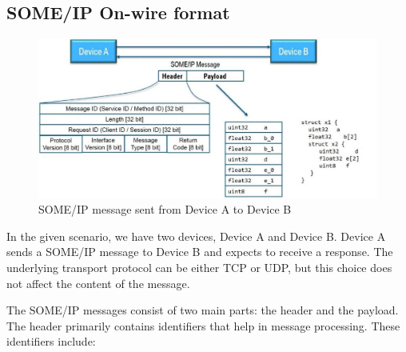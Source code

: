 \documentclass[
12pt,
oneside, 
onehalfspacing, 
nolistspacing, 
parskip, 
chapterinoneline, 
]{AASTCOMPUTER}
\begin{document}
\subsection{SOME/IP On-wire format}
\begin{figure}[!ht]
\centering
\includegraphics[scale=0.3]{Figures/18.png}
\caption[SOMEIP message sent from Device A to Device B]{SOME/IP message sent from Device A to Device B}
\label{fig:SOME/IP On-wire format}
\end{figure}


In the given scenario, we have two devices, Device A and Device B. Device A sends a SOME/IP message to Device B and expects to receive a response. The underlying transport protocol can be either TCP or UDP, but this choice does not affect the content of the message.

The SOME/IP messages consist of two main parts: the header and the payload. The header primarily contains identifiers that help in message processing. These identifiers include:
\end{document}
